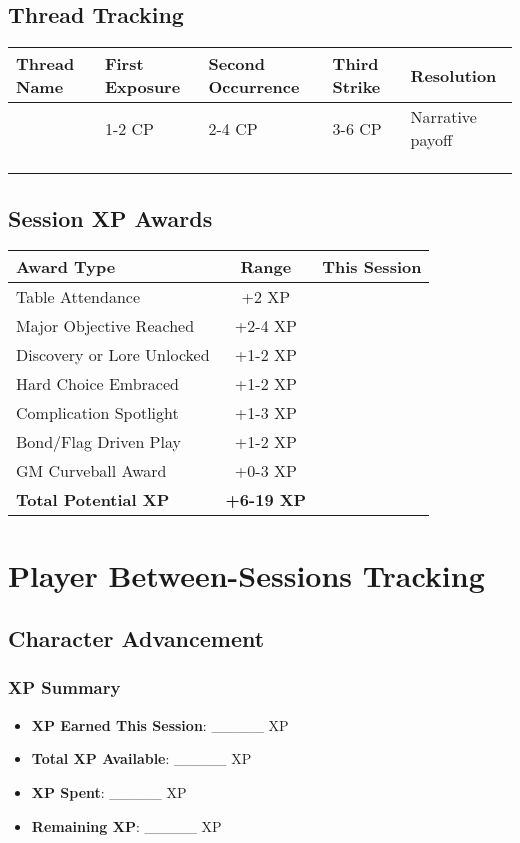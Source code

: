 \documentclass[11pt,letterpaper]{article}
\begin{document}
\subsection{Thread Tracking}

\begin{tabularx}{\textwidth}{|X|l|l|l|l|}
\hline
\textbf{Thread Name} & \textbf{First Exposure} & \textbf{Second Occurrence} & \textbf{Third Strike} & \textbf{Resolution} \\
\hline
& 1-2 CP & 2-4 CP & 3-6 CP & Narrative payoff \\
& & & & \\
& & & & \\
& & & & \\
\hline
\end{tabularx}

\subsection{Session XP Awards}

\begin{tabularx}{\textwidth}{|X|c|c|}
\hline
\textbf{Award Type} & \textbf{Range} & \textbf{This Session} \\
\hline
Table Attendance & +2 XP & \\
Major Objective Reached & +2-4 XP & \\
Discovery or Lore Unlocked & +1-2 XP & \\
Hard Choice Embraced & +1-2 XP & \\
Complication Spotlight & +1-3 XP & \\
Bond/Flag Driven Play & +1-2 XP & \\
GM Curveball Award & +0-3 XP & \\
\textbf{Total Potential XP} & \textbf{+6-19 XP} & \\
\hline
\end{tabularx}

\newpage

\section{Player Between-Sessions Tracking}

\subsection{Character Advancement}

\subsubsection{XP Summary}
\begin{itemize}
    \item \textbf{XP Earned This Session}: \_\_\_\_\_ XP
    \item \textbf{Total XP Available}: \_\_\_\_\_ XP
    \item \textbf{XP Spent}: \_\_\_\_\_ XP
    \item \textbf{Remaining XP}: \_\_\_\_\_ XP
\end{itemize}
\end{document}
